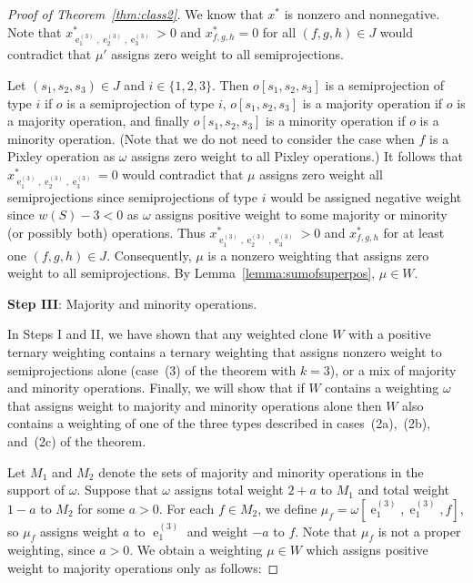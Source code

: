 \documentclass[11pt, reqno]{article}
\DeclareMathOperator{\proj}{\ensuremath{e}}
\theoremstyle{remark}
\begin{document}
\begin{proof}[Proof of Theorem~\ref{thm:class2}]
  We know that $x^*$ is nonzero and nonnegative. Note that
  $x^*_{\proj^{(3)}_1,\proj^{(3)}_2,\proj^{(3)}_3}>0$ and $x^*_{f,g,h}=0$ for
  all $(f,g,h)\in J$ would contradict that $\mu'$ assigns zero weight to all
  semiprojections. 

  Let $(s_1,s_2,s_3)\in J$ and $i\in\{1,2,3\}$. Then $o[s_1,s_2,s_3]$ is a
  semiprojection of type $i$ if $o$ is a semiprojection of type $i$,
  $o[s_1,s_2,s_3]$ is a majority operation if $o$ is a majority operation, and
  finally $o[s_1,s_2,s_3]$ is a minority operation if $o$ is a minority
  operation. (Note that we do not need to consider the case when $f$ is a Pixley
  operation as $\omega$ assigns zero weight to all  Pixley operations.) 
  It follows that $x^*_{\proj^{(3)}_1,\proj^{(3)}_2,\proj^{(3)}_3}=0$ would
  contradict that $\mu$ assigns zero weight all semiprojections since
  semiprojections of type $i$ would be assigned negative weight since $w(S)-3<0$
  as $\omega$ assigns positive weight to some majority or minority (or possibly
  both) operations. 
  Thus $x^*_{\proj^{(3)}_1,\proj^{(3)}_2,\proj^{(3)}_3}>0$ and $x^*_{f,g,h}$ for
  at least one $(f,g,h)\in J$. Consequently, $\mu$ is a nonzero weighting that
  assigns zero weight to all semiprojections. By
  Lemma~\ref{lemma:sumofsuperpos}, $\mu\in W$.


  \textbf{Step III}: Majority and minority operations.

  In Steps I and II, we have shown that any weighted clone $W$ with a positive ternary weighting
  contains a ternary weighting that assigns nonzero weight to semiprojections
  alone (case~(3) of the theorem with $k=3$), or a mix of majority and minority operations. Finally, we will show
  that if $W$ contains a weighting $\omega$
  that assigns weight to majority and minority operations alone then $W$ also
  contains a weighting of one of the three types described in
  cases~(2a),~(2b), and~(2c) of the theorem.
  
  Let $M_1$ and $M_2$ denote the sets of majority and minority operations in the
  support of $\omega$. Suppose that $\omega$ assigns total weight $2+a$ to $M_1$
  and total weight $1-a$ to $M_2$ for some $a > 0$. 
  For each $f \in M_2$, we define $\mu_f =
  \omega[\proj^{(3)}_1,\proj^{(3)}_1,f]$, so $\mu_f$ assigns weight $a$ to
  $\proj^{(3)}_1$ and weight $-a$ to $f$. Note that $\mu_f$ is not a proper
  weighting, since $a > 0$. We obtain a weighting $\mu \in W$
  which assigns positive weight to majority operations only as follows:


\end{proof}
\end{document}
